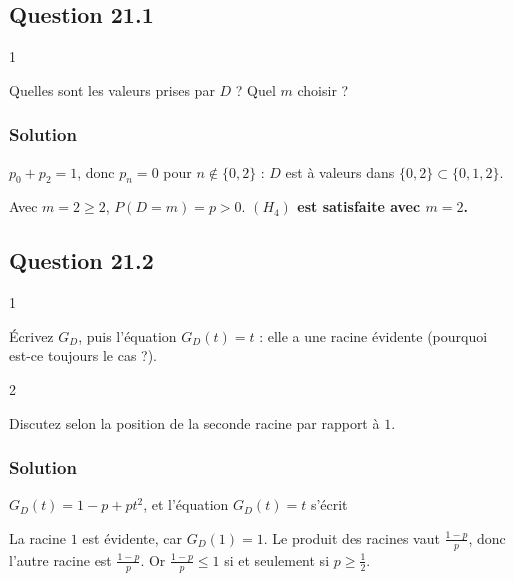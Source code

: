 \documentclass[11pt,a4paper]{article}
\newcommand{\equationajustee}[1]{%
  \sbox{\boiteequation}{$\displaystyle #1$}%
  \ifdim\wd\boiteequation>\linewidth
    \[\resizebox{\linewidth}{!}{\usebox{\boiteequation}}\]%
  \else
    \[#1\]%
  \fi}
\begin{document}
\hypertarget{question-21.1}{%
\subsection{Question 21.1}\label{question-21.1}}

\begin{indication}{1}

Quelles sont les valeurs prises par \(D\) ? Quel \(m\) choisir ?

\end{indication}

\hypertarget{solution-41}{%
\subsubsection{Solution}\label{solution-41}}

\(p_0+p_2=1\), donc \(p_n=0\) pour \(n\notin\{0,2\}\) : \(D\) est à valeurs dans \(\{0,2\}\subset\{0,1,2\}\).

Avec \(m=2\ge2\), \(P(D=m)=p>0\). \textbf{\((H_4)\) est satisfaite avec \(m=2\).}

\hypertarget{question-21.2}{%
\subsection{Question 21.2}\label{question-21.2}}

\begin{indication}{1}

Écrivez \(G_D\), puis l'équation \(G_D(t)=t\) : elle a une racine évidente (pourquoi est-ce toujours le cas ?).

\end{indication}

\begin{indication}{2}

Discutez selon la position de la seconde racine par rapport à \(1\).

\end{indication}

\hypertarget{solution-42}{%
\subsubsection{Solution}\label{solution-42}}

\(G_D(t)=1-p+pt^2\), et l'équation \(G_D(t)=t\) s'écrit

\equationajustee{pt^2-t+1-p=0 .}

La racine \(1\) est évidente, car \(G_D(1)=1\). Le produit des racines vaut \(\frac{1-p}p\), donc l'autre racine est \(\frac{1-p}p\). Or \(\frac{1-p}p\le1\) si et seulement si \(p\ge\frac12\).
\end{document}
